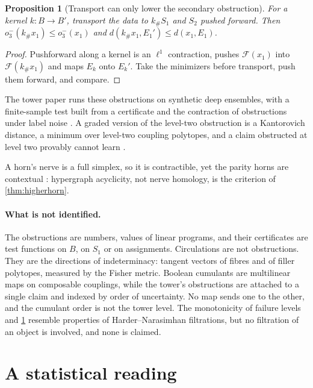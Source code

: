 \documentclass[11pt]{article}
\newtheorem{proposition}[theorem]{Proposition}
\theoremstyle{definition}
\theoremstyle{remark}
\begin{document}
\begin{proposition}[Transport can only lower the secondary obstruction]\label{prop:o3transport}
For a kernel $k\colon B\to B'$, transport the data to $k_\#S_1$ and $S_2$ pushed forward. Then $o_3^-(k_\#x_1)\le o_3^-(x_1)$ and
$d(k_\#x_1,E_1')\le d(x_1,E_1)$.
\end{proposition}
\begin{proof}
Pushforward along a kernel is an $\ell^1$ contraction, pushes $\mathcal F(x_1)$ into $\mathcal F(k_\#x_1)$ and maps $E_k$
onto $E_k'$. Take the minimizers before transport, push them forward, and compare.
\end{proof}

The tower paper runs these obstructions on synthetic deep ensembles, with a finite-sample test built from a certificate
and the contraction of obstructions under label noise \cite[Section~11]{Awasthi-Tower}. A graded version of the level-two
obstruction is a Kantorovich distance, a minimum over level-two coupling polytopes, and a claim obstructed at level two
provably cannot learn \cite[Lemma~52.1, Cor.~52.3]{Awasthi-ThreeLayers}.

A horn's nerve is a full simplex, so it is contractible, yet the parity horns are contextual
\cite[Prop.~3.10]{Awasthi-ThreeLayers}: hypergraph acyclicity, not nerve homology, is the criterion of \cref{thm:higherhorn}.

\paragraph{What is not identified.} The obstructions are numbers, values of linear programs, and their certificates are test
functions on $B$, on $S_1$ or on assignments. Circulations are not obstructions. They are the directions of indeterminacy:
tangent vectors of fibres and of filler polytopes, measured by the Fisher metric. Boolean cumulants are multilinear maps on
composable couplings, while the tower's obstructions are attached to a single claim and indexed by order of uncertainty. No
map sends one to the other, and the cumulant order is not the tower level. The monotonicity of failure levels
\cite[Thm.~10.5]{Awasthi-Tower} and \cref{prop:o3transport} resemble properties of Harder--Narasimhan filtrations, but no
filtration of an object is involved, and none is claimed.

\section{A statistical reading}\label{sec:stats}
\end{document}
